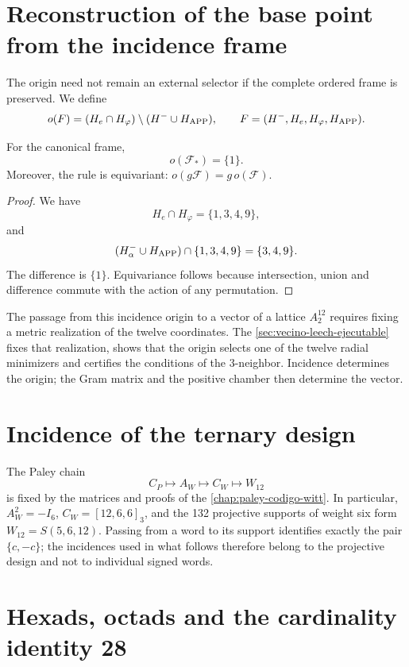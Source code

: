 \section{Reconstruction of the base point from the incidence frame}

The origin need not remain an external selector if the complete ordered
frame is preserved. We define
\[
o(\mathcal F)
=(H_e\cap H_\varphi)\setminus(H^-\cup H_{\rm APP}),
\qquad
\mathcal F=(H^-,H_e,H_\varphi,H_{\rm APP}).
\]

\begin{theorem}
For the canonical frame,
\[
o(\mathcal F_*)=\{1\}.
\]
Moreover, the rule is equivariant: \(o(g\mathcal F)=g\,o(\mathcal F)\).
\end{theorem}

\begin{proof}
We have
\[
H_e\cap H_\varphi=\{1,3,4,9\},
\]
and
\[
(H^-_\alpha\cup H_{\rm APP})\cap\{1,3,4,9\}
=\{3,4,9\}.
\]
The difference is \(\{1\}\). Equivariance follows because intersection,
union and difference commute with the action of any permutation.
\end{proof}

The passage from this incidence origin to a vector of a lattice
\(A_2^{12}\) requires fixing a metric realization of the twelve coordinates.
The \cref{sec:vecino-leech-ejecutable} fixes that realization, shows
that the origin selects one of the twelve radial minimizers and certifies
the conditions of the 3-neighbor. Incidence determines the origin; the Gram
matrix and the positive chamber then determine the vector.

\section{Incidence of the ternary design}

The Paley chain
\[
C_P\longmapsto A_W\longmapsto C_W\longmapsto W_{12}
\]
is fixed by the matrices and proofs of the
\cref{chap:paley-codigo-witt}. In particular,
\(A_W^2=-I_6\), \(C_W=[12,6,6]_3\), and the 132 projective supports of
weight six form \(W_{12}=S(5,6,12)\). Passing from a word to its support
identifies exactly the pair \(\{c,-c\}\); the incidences used in
what follows therefore belong to the projective design and not to individual signed
words.

\section{Hexads, octads and the cardinality identity 28}

